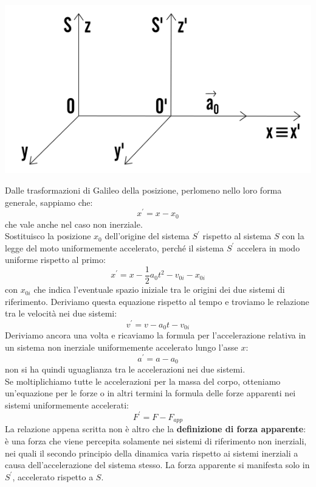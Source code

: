 \documentclass[a4paper,12pt, oneside]{book}
\begin{document}
\begin{center}
\includegraphics[scale=0.5]{img/gal2.png}
\end{center}
Dalle trasformazioni di Galileo della posizione, perlomeno nello loro forma generale, sappiamo che:
$$x^{'}=x-x_0$$
che vale anche nel caso non inerziale.\\
Sostituisco la posizione $x_0$ dell'origine del sistema $S^{'}$ rispetto al sistema $S$  con la legge del moto uniformemente accelerato, perché il sistema $S^{'}$ accelera in modo uniforme rispetto al primo:
$$x^{'}=x-\frac{1}{2}a_0t^2-v_{0i}-x_{0i}$$
con $x_{0i}$ che indica l'eventuale spazio iniziale tra le origini dei due sistemi di riferimento. Deriviamo questa equazione rispetto al tempo e troviamo le relazione tra le velocità nei due sistemi:
$$v^{'}=v-a_0t-v_{0i}$$
Deriviamo ancora una volta e ricaviamo la formula per l'accelerazione relativa in un sistema non inerziale uniformemente accelerato lungo l'asse $x$:
$$a^{'}=a-a_0$$
non si ha quindi uguaglianza tra le accelerazioni nei due sistemi.
\\Se moltiplichiamo tutte le accelerazioni per la massa del corpo, otteniamo un'equazione per le forze o in altri termini la formula delle forze apparenti nei sistemi uniformemente accelerati:
$$F^{'}=F-F_{app}$$ 
La relazione appena scritta non è altro che la \textbf{definizione di forza apparente}: è una forza che viene percepita solamente nei sistemi di riferimento non inerziali, nei quali il secondo principio della dinamica varia rispetto ai sistemi inerziali a causa dell'accelerazione del sistema stesso. La forza apparente si manifesta solo in $S^{'}$, accelerato rispetto a $S$.
\end{document}
